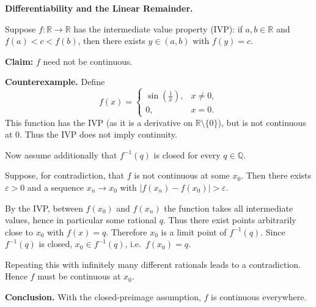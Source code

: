 \begin{problem}[CP-II-0435]
\label{prob:cp-ii-0435}
\textbf{Differentiability and the Linear Remainder.}

\hspace*{1.5em}Suppose $f:\mathbb{R}\to\mathbb{R}$ has the intermediate value property (IVP): if $a,b\in\mathbb{R}$ and $f(a)<c<f(b)$, then there exists $y\in(a,b)$ with $f(y)=c$.

\textbf{Claim:} $f$ need not be continuous.

\textbf{Counterexample.} Define
\[
f(x)=\begin{cases}
	\sin\!\left(\tfrac{1}{x}\right), & x\neq 0,\\
	0, & x=0.
\end{cases}
\]
This function has the IVP (as it is a derivative on $\mathbb{R}\setminus\{0\}$), but is not continuous at $0$.
Thus the IVP does not imply continuity.

Now assume additionally that $f^{-1}(q)$ is closed for every $q\in\mathbb{Q}$.

Suppose, for contradiction, that $f$ is not continuous at some $x_0$.
Then there exists $\varepsilon>0$ and a sequence $x_n\to x_0$ with $|f(x_n)-f(x_0)|>\varepsilon$.

By the IVP, between $f(x_0)$ and $f(x_n)$ the function takes all intermediate values, hence in particular some rational $q$.
Thus there exist points arbitrarily close to $x_0$ with $f(x)=q$.
Therefore $x_0$ is a limit point of $f^{-1}(q)$.
Since $f^{-1}(q)$ is closed, $x_0\in f^{-1}(q)$, i.e.\ $f(x_0)=q$.

Repeating this with infinitely many different rationals leads to a contradiction.
Hence $f$ must be continuous at $x_0$.

\textbf{Conclusion.} With the closed-preimage assumption, $f$ is continuous everywhere.

\end{problem}

